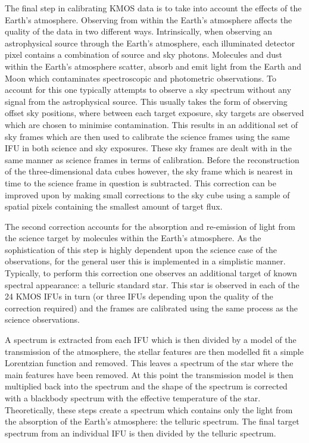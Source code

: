 The final step in calibrating KMOS data is to take into account the effects of the Earth's atmosphere.
Observing from within the Earth's atmosphere affects the quality of the data in two different ways.
Intrinsically, when observing an astrophysical source through the Earth's atmosphere, each illuminated detector pixel contains a combination of source and sky photons.
Molecules and dust within the Earth's atmosphere scatter, absorb and emit light from the Earth and Moon which contaminates spectroscopic and photometric observations.
To account for this one typically attempts to observe a sky spectrum without any signal from the astrophysical source.
This usually takes the form of observing offset sky positions, where between each target exposure, sky targets are observed which are chosen to minimise contamination.
This results in an additional set of sky frames which are then used to calibrate the science frames using the same IFU in both science and sky exposures.
These sky frames are dealt with in the same manner as science frames in terms of calibration.
Before the reconstruction of the three-dimensional data cubes however, the sky frame which is nearest in time to the science frame in question is subtracted.
This correction can be improved upon by making small corrections to the sky cube using a sample of spatial pixels containing the smallest amount of target flux.

The second correction accounts for the absorption and re-emission of light from the science target by molecules within the Earth's atmosphere.
As the sophistication of this step is highly dependent upon the science case of the observations, for the general user this is implemented in a simplistic manner.
Typically, to perform this correction one observes an additional target of known spectral appearance: a telluric standard star.
This star is observed in each of the 24 KMOS IFUs in turn (or three IFUs depending upon the quality of the correction required) and the frames are calibrated using the same process as the science observations.

A spectrum is extracted from each IFU which is then divided by a model of the transmission of the atmosphere, the stellar features are then modelled fit a simple Lorentzian function and removed.
This leaves a spectrum of the star where the main features have been removed.
At this point the transmission model is then multiplied back into the spectrum and the shape of the spectrum is corrected with a blackbody spectrum with the effective temperature of the star.
Theoretically, these steps create a spectrum which contains only the light from the absorption of the Earth's atmosphere: the telluric spectrum.
The final target spectrum from an individual IFU is then divided by the telluric spectrum.

